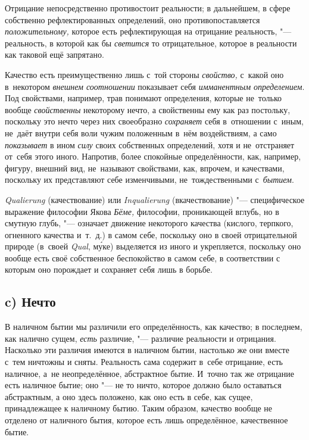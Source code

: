 Отрицание непосредственно противостоит реальности; в дальнейшем, в сфере
собственно рефлектированных определений, оно противопоставляется
{\em положительному,} которое есть рефлектирующая на
отрицание реальность, "--- реальность, в которой как бы
{\em светится} то отрицательное, которое в реальности
как таковой ещё запрятано.

Качество есть преимущественно лишь с~той стороны {\em свойство,} с~какой оно
в~некотором {\em внешнем соотношении} показывает себя {\em имманентным
определением}. Под свойствами, например, трав понимают определения, которые
не~только вообще {\em свойственны} некоторому нечто, а свойственны ему как раз
постольку, поскольку это нечто через них своеобразно {\em сохраняет} себя
в~отношении с~иным, не~даёт внутри себя воли чужим положенным в~нём
воздействиям, а само {\em показывает} в ином {\em силу} своих собственных
определений, хотя и не~отстраняет от~себя этого иного. Напротив, более
спокойные определённости, как, например, фигуру, внешний вид, не~называют
свойствами, как, впрочем, и качествами, поскольку их представляют себе
изменчивыми, не~тождественными с~{\em бытием}.

{\em Quali\-erung} (качествование) или {\em Inquali\-erung} (вкачествование)
"--- специфическое выражение философии Якова {\em Бёме,} философии, проникающей
вглубь, но в смутную глубь, "--- означает движение некоторого качества
(кислого, терпкого, огненного качества и~т.~д.) в самом себе, поскольку оно в
своей отрицательной природе (в~своей {\em Qual},
м\'{у}ке) выделяется из иного и укрепляется, поскольку оно вообще есть своё
собственное беспокойство в самом себе, в соответствии с которым оно порождает
и сохраняет себя лишь в борьбе.

\subsection[c) Нечто]{c) Нечто}

В наличном бытии мы различили его определённость, как качество; в последнем,
как налично сущем, {\em есть} различие, "--- различие реальности и отрицания.
Насколько эти различия имеются в наличном бытии, настолько же они вместе с~тем
ничтожны и сняты. Реальность сама содержит в~себе отрицание, есть наличное,
а~не неопределённое, абстрактное бытие. И~точно так же отрицание есть наличное
бытие; оно "--- не то ничто, которое должно было оставаться абстрактным, а оно
здесь положено, как оно есть в себе, как сущее, принадлежащее к наличному
бытию. Таким образом, качество вообще не отделено от наличного бытия, которое
есть лишь определённое, качественное бытие.

